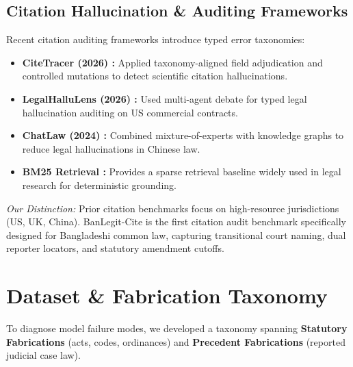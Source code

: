 \documentclass[conference]{IEEEtran}
\begin{document}
\subsection{Citation Hallucination \& Auditing Frameworks}
Recent citation auditing frameworks introduce typed error taxonomies:
\begin{itemize}
\item \textbf{CiteTracer (2026) \cite{citetracer2026}:} Applied taxonomy-aligned field adjudication and controlled mutations to detect scientific citation hallucinations.
\item \textbf{LegalHalluLens (2026) \cite{legalhallulens2026}:} Used multi-agent debate for typed legal hallucination auditing on US commercial contracts.
\item \textbf{ChatLaw (2024) \cite{chatlaw2024}:} Combined mixture-of-experts with knowledge graphs to reduce legal hallucinations in Chinese law.
\item \textbf{BM25 Retrieval \cite{bm25}:} Provides a sparse retrieval baseline widely used in legal research for deterministic grounding.
\end{itemize}

\textit{Our Distinction:} Prior citation benchmarks focus on high-resource jurisdictions (US, UK, China). BanLegit-Cite is the first citation audit benchmark specifically designed for Bangladeshi common law, capturing transitional court naming, dual reporter locators, and statutory amendment cutoffs.

\section{Dataset \& Fabrication Taxonomy}
To diagnose model failure modes, we developed a taxonomy spanning \textbf{Statutory Fabrications} (acts, codes, ordinances) and \textbf{Precedent Fabrications} (reported judicial case law).
\end{document}
